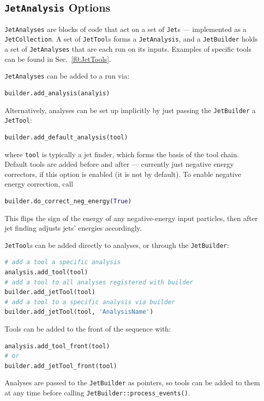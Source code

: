 \documentclass{article}
\newcommand{\code}[1]{{\tt #1}\xspace}
\newcommand{\codes}[1]{{\tt #1}s\xspace}
\begin{document}
\subsection{\code{JetAnalysis} Options}

\code{JetAnalyses} are blocks of code that act on a set of \codes{Jet} --- implemented as a \code{JetCollection}.  A set of \codes{JetTool} forms a \code{JetAnalysis}, and a \code{JetBuilder} holds a set of \code{JetAnalyses} that are each run on its inputs.  Examples of specific tools can be found in Sec.~\ref{f0:JetTools}. 

\code{JetAnalyses} can be added to a run via:
\begin{lstlisting}[language=Python]
builder.add_analysis(analyis)
\end{lstlisting}

Alternatively, analyses can be set up implicitly by just passing the \code{JetBuilder} a \code{JetTool}:
\begin{lstlisting}[language=Python]
builder.add_default_analysis(tool)
\end{lstlisting}
where \code{tool} is typically a jet finder, which forms the basis of the tool chain.  Default tools are added before and after --- currently just negative energy correctors, if this option is enabled (it is not by default).  To enable negative energy correction, call
\begin{lstlisting}[language=Python]
builder.do_correct_neg_energy(True)
\end{lstlisting}
This flips the sign of the energy of any negative-energy input particles, then after jet finding adjusts jets' energies accordingly.

\codes{JetTool} can be added  directly to analyses, or through the \code{JetBuilder}:
\begin{lstlisting}[language=Python]
# add a tool a specific analysis
analysis.add_tool(tool)
# add a tool to all analyses registered with builder
builder.add_jetTool(tool)
# add a tool to a specific analysis via builder
builder.add_jetTool(tool, 'AnalysisName')
\end{lstlisting}
Tools can be added to the front of the sequence with:
\begin{lstlisting}[language=Python]
analysis.add_tool_front(tool)
# or
builder.add_jetTool_front(tool)
\end{lstlisting}

Analyses are passed to the \code{JetBuilder} as pointers, so tools can be added to them at any time before calling \code{JetBuilder::process\_events()}.
\end{document}
